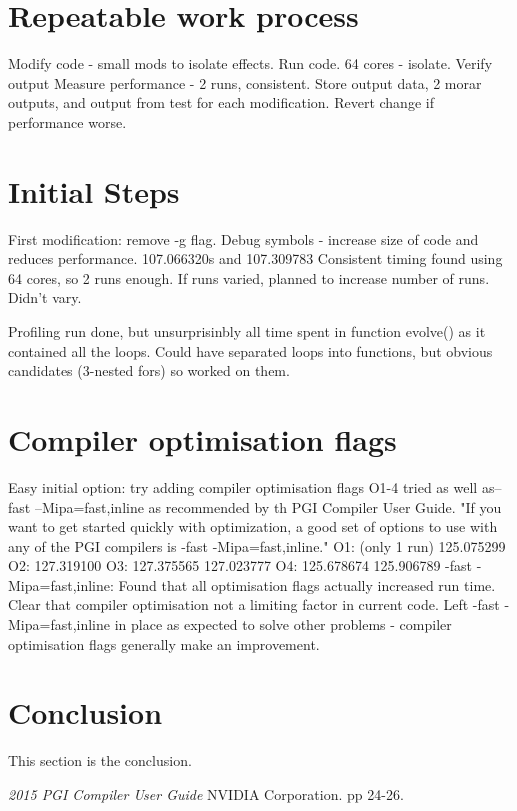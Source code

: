 \documentclass[11pt, oneside]{article}   %
\begin{document}
\section{Repeatable work process}
Modify code - small mods to isolate effects.
Run code.
64 cores - isolate.
Verify output
Measure performance - 2 runs, consistent.
Store output data, 2 morar outputs, and output from test for each modification.
Revert change if performance worse.

\section{Initial Steps}
First modification: remove -g flag.
Debug symbols - increase size of code and reduces performance.
107.066320s and 107.309783 
Consistent timing found using 64 cores, so 2 runs enough.
If runs varied, planned to increase number of runs.  Didn't vary.

Profiling run done, but unsurprisinbly all time spent in function evolve() as it contained all the loops.  Could have separated loops into functions, but obvious candidates (3-nested fors) so worked on them.

\section{Compiler optimisation flags}
Easy initial option: try adding compiler optimisation flags  O1-4 tried as well as–fast –Mipa=fast,inline  as recommended by th PGI Compiler User Guide. \cite{ref:PgiCC}  "If you want to get started quickly with optimization, a good set of options to use with any of the PGI compilers is -fast -Mipa=fast,inline."
O1: (only 1 run) 125.075299
O2: 127.319100
O3: 127.375565 127.023777
O4: 125.678674 125.906789
-fast -Mipa=fast,inline: 
Found that all optimisation flags actually increased run time.  Clear that compiler optimisation not a limiting factor in current code.
Left -fast -Mipa=fast,inline in place as expected to solve other problems - compiler optimisation flags generally make an improvement.

\section{Conclusion}
This section is the conclusion.

\begin{thebibliography}{100}

 {\em 2015 PGI Compiler User Guide} NVIDIA Corporation. pp 24-26.

\end{thebibliography}
\end{document}
